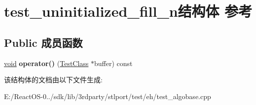 \hypertarget{structtest__uninitialized__fill__n}{}\section{test\+\_\+uninitialized\+\_\+fill\+\_\+n结构体 参考}
\label{structtest__uninitialized__fill__n}
\subsection*{Public 成员函数}
\begin{DoxyCompactItemize}
\item 
\mbox{\label{structtest__uninitialized__fill__n_a0b44f3109d2cdd4206e52bf953ad1458}} 
\hyperlink{interfacevoid}{void} {\bfseries operator()} (\hyperlink{class_test_class}{Test\+Class} $\ast$buffer) const
\end{DoxyCompactItemize}


该结构体的文档由以下文件生成\+:\begin{DoxyCompactItemize}
\item 
E\+:/\+React\+O\+S-\/0../sdk/lib/3rdparty/stlport/test/eh/test\+\_\+algobase.\+cpp\end{DoxyCompactItemize}
